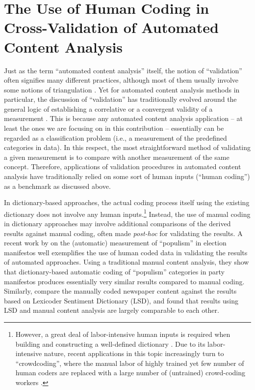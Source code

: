 \documentclass[man, 12pt, a4paper, nolmodern, noextraspace]{apa6}
\begin{document}
\section{The Use of Human Coding in Cross-Validation of Automated Content Analysis}
    
    Just as the term \enquote{automated content analysis} itself, the notion of \enquote{validation} often signifies many different practices, although most of them usually involve some notions of triangulation \parencites{Neunhoeffer2018}. Yet for automated content analysis methods in particular, the discussion of \enquote{validation} has traditionally evolved around the general logic of establishing a correlative or a convergent validity of a measurement \parencites[][]{Krippendorff2008validity}. This is because any automated content analysis application -- at least the ones we are focusing on in this contribution -- essentially can be regarded as a classification problem (i.e., a measurement of the predefined categories in data). In this respect, the most straightforward method of validating a given measurement is to compare with another measurement of the same concept. Therefore, applications of validation procedures in automated content analysis have traditionally relied on some sort of human inputs (“human coding”) as a benchmark as discussed above. 
    
    In dictionary-based approaches, the actual coding process itself using the existing dictionary does not involve any human inputs.\footnote{However, a great deal of labor-intensive human inputs is required when building and constructing a well-defined dictionary \parencite{YoungSoroka2012, muddiman2018re}. Due to its labor-intensive nature, recent applications in this topic increasingly turn to \enquote{crowdcoding}, where the manual labor of highly trained yet few number of human coders are replaced with a large number of (untrained) crowd-coding workers \parencites[][]{haselmayer2017sentiment, lind2017content}.}  Instead, the use of manual coding in dictionary approaches may involve additional comparisons of the derived results against manual coding, often made \textit{post-hoc} for validating the results. A recent work by \textcite{Rooduijn2011} on the (automatic) measurement of \enquote{populism} in election manifestos well exemplifies the use of human coded data in validating the results of automated approaches. Using a traditional manual content analysis, they show that dictionary-based automatic coding of \enquote{populism} categories in party manifestos produces essentially very similar results compared to manual coding. Similarly, \textcite{YoungSoroka2012} compare the manually coded newspaper content against the results based on Lexicoder Sentiment Dictionary (LSD), and found that results using LSD and manual content analysis are largely comparable to each other.
    
\end{document}
